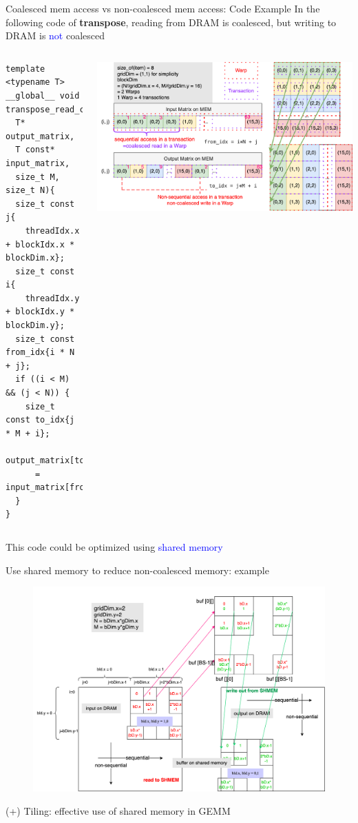\documentclass[dvipdfmx, 11pt, aspectratio=169]{beamer}   %
\begin{document}
\begin{frame}[fragile]{Coalesced mem access vs non-coalesced mem access: Code Example}
  In the following code of \textbf{transpose}, reading from DRAM is coalesced, but writing to DRAM is \textcolor{blue}{not} coalesced
  \begin{columns}
\begin{lstlisting}[language=CUDA, basicstyle=\ttfamily\tiny]
template <typename T>
__global__ void transpose_read_coalesced(
  T* output_matrix, 
  T const* input_matrix,
  size_t M, size_t N){
  size_t const j{
    threadIdx.x + blockIdx.x * blockDim.x};
  size_t const i{
    threadIdx.y + blockIdx.y * blockDim.y};
  size_t const from_idx{i * N + j};
  if ((i < M) && (j < N)) {
    size_t const to_idx{j * M + i};
    output_matrix[to_idx] 
      = input_matrix[from_idx];
  }
}
\end{lstlisting}
    \includegraphics[scale=0.1]{img/transposeReadCoalesced.png}
  \end{columns}
  This code could be optimized using \textcolor{blue}{shared memory}
\end{frame}
\begin{frame}{Use shared memory to reduce non-coalesced memory: example}
  \begin{figure}
    \includegraphics[scale=0.08]{img/transposeFullCoalesced.png}
  \end{figure}
\end{frame}
\begin{frame}{(+) Tiling: effective use of shared memory in GEMM}
  
\end{frame}
\end{document}
